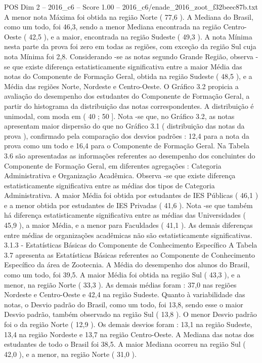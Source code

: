 \begin{textsample}{POS Dim 2 – 2016\_c6 – Score 1.00 – 2016\_c6/enade\_2016\_zoot\_f32beec87b.txt}
A menor nota Máxima foi obtida na região Norte ( 77,6 ).
A Mediana do Brasil, como um todo, foi 46,3, sendo a menor Mediana encontrada na região Centro-Oeste ( 42,5 ), e a maior, encontrada na região Sudeste ( 49,3 ).
A nota Mínima nesta parte da prova foi zero em todas as regiões, com exceção da região Sul cuja nota Mínima foi 2,8.
Considerando -se as notas segundo Grande Região, observa -se que existe diferença estatisticamente significativa entre a maior Média das notas do Componente de Formação Geral, obtida na região Sudeste ( 48,5 ), e a Média das regiões Norte, Nordeste e Centro-Oeste.
O Gráfico 3.2 propicia a avaliação do desempenho dos estudantes do Componente de Formação Geral, a partir do histograma da distribuição das notas correspondentes.
A distribuição é unimodal, com moda em ( 40 ; 50 ].
Nota -se que, no Gráfico 3.2, as notas apresentam maior dispersão do que no Gráfico 3.1 ( distribuição das notas da prova ), confirmado pela comparação dos desvios padrões : 12,4 para a nota da prova como um todo e 16,4 para o Componente de Formação Geral.
Na Tabela 3.6 são apresentadas as informações referentes ao desempenho dos concluintes do Componente de Formação Geral, em diferentes agregações : Categoria Administrativa e Organização Acadêmica.
Observa -se que existe diferença estatisticamente significativa entre as médias dos tipos de Categoria Administrativa.
A maior Média foi obtida por estudantes de IES Públicas ( 46,1 ) e a menor obtida por estudantes de IES Privadas ( 41,6 ).
Nota -se que também há diferença estatisticamente significativa entre as médias das Universidades ( 45,9 ), a maior Média, e a menor para Faculdades ( 41,1 ).
As demais diferenças entre médias de organizações acadêmicas não são estatisticamente significativas. 3.1.3 - Estatísticas Básicas do Componente de Conhecimento Específico A Tabela 3.7 apresenta as Estatísticas Básicas referentes ao Componente de Conhecimento Específico da área de Zootecnia.
A Média do desempenho dos alunos do Brasil, como um todo, foi 39,5.
A maior Média foi obtida na região Sul ( 43,3 ), e a menor, na região Norte ( 33,3 ).
As demais médias foram : 37,0 nas regiões Nordeste e Centro-Oeste e 42,4 na região Sudeste.
Quanto à variabilidade das notas, o Desvio padrão do Brasil, como um todo, foi 13,8, sendo esse o maior Desvio padrão, também observado na região Sul ( 13,8 ).
O menor Desvio padrão foi o da região Norte ( 12,9 ).
Os demais desvios foram : 13,1 na região Sudeste, 13,4 na região Nordeste e 13,7 na região Centro-Oeste.
A Mediana das notas dos estudantes de todo o Brasil foi 38,5.
A maior Mediana ocorreu na região Sul ( 42,0 ), e a menor, na região Norte ( 31,0 ).

\end{textsample}
